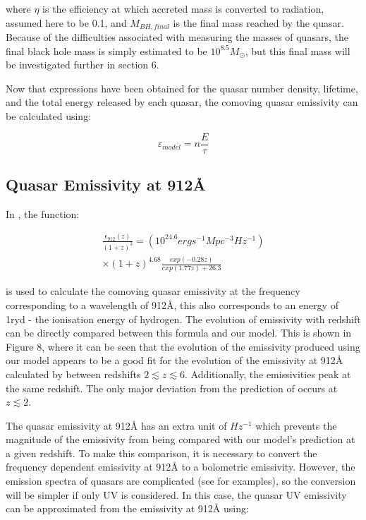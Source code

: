 \documentclass[12pt]{article}%
\begin{document}
\noindent where $\eta$ is the efficiency at which accreted mass is converted to radiation, assumed here to be 0.1, and $M_{BH,final}$ is the final mass reached by the quasar. Because of the difficulties associated with measuring the masses of quasars, the final black hole mass is simply estimated to be $10^{8.5}M_\odot$, but this final mass will be investigated further in section 6.\par

Now that expressions have been obtained for the quasar number density, lifetime, and the total energy released by each quasar, the comoving quasar emissivity can be calculated using:

\begin{equation}
    \varepsilon_{model}=n\frac{E}{\tau}
\end{equation}

\subsection{Quasar Emissivity at 912\AA}

In \cite{Haardt_Madau}, the function:

\begin{multline}
    \frac{\epsilon_{912}(z)}{(1+z)^3}=(10^{24.6}erg s^{-1}Mpc^{-3}Hz^{-1})\\
    \times(1+z)^{4.68}\frac{exp(-0.28z)}{exp(1.77z)+26.3}
\end{multline}

\noindent is used to calculate the comoving quasar emissivity at the frequency corresponding to a wavelength of 912\AA, this also corresponds to an energy of 1ryd - the ionisation energy of hydrogen. The evolution of emissivity with redshift can be directly compared between this formula and our model. This is shown in Figure 8, where it can be seen that the evolution of the emissivity produced using our model appears to be a good fit for the evolution of the emissivity at 912\AA \: calculated by \cite{Haardt_Madau} between redshifts $2\lesssim z\lesssim6$. Additionally, the emissivities peak at the same redshift. The only major deviation from the prediction of \citeauthor{Haardt_Madau} occurs at $z\lesssim2$.\par

The quasar emissivity at 912\AA \: has an extra unit of $Hz^{-1}$ which prevents the magnitude of the emissivity from being compared with our model's prediction at a given redshift. To make this comparison, it is necessary to convert the frequency dependent emissivity at 912\AA \: to a bolometric emissivity. However, the emission spectra of quasars are complicated (see \cite{QSO_Spectrum} for examples), so the conversion will be simpler if only UV is considered. In this case, the quasar UV emissivity can be approximated from the emissivity at 912\AA \: using:
\end{document}
